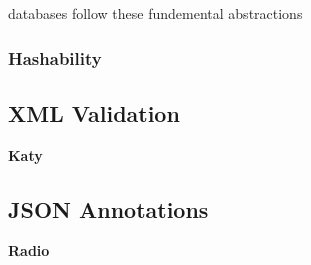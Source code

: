 \Cyclus databases follow these fundemental abstractions

\subsubsection{Hashability}

\subsection{XML Validation}

\textbf{Katy}

\subsection{JSON Annotations}

\textbf{Radio}
